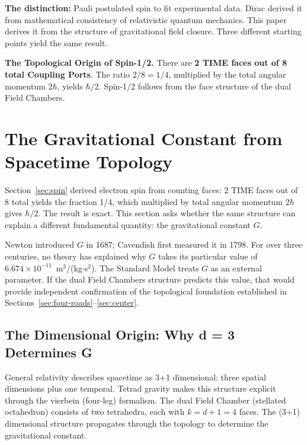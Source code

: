 \documentclass[aps,prd,preprint,superscriptaddress,showpacs,preprintnumbers,amsmath,amssymb,nofootinbib]{revtex4-2}
\begin{document}
\textbf{The distinction:} Pauli postulated spin to fit experimental data. Dirac derived it from mathematical consistency of relativistic quantum mechanics. This paper derives it from the structure of gravitational field closure. Three different starting points yield the same result.

\textbf{The Topological Origin of Spin-1/2.} There are \textbf{2 TIME faces out of 8 total Coupling Ports}. The ratio $2/8 = 1/4$, multiplied by the total angular momentum $2\hbar$, yields $\hbar/2$. Spin-1/2 follows from the face structure of the dual Field Chambers.

\section{The Gravitational Constant from Spacetime Topology}
\label{sec:gravitational-constant}

Section~\ref{sec:spin} derived electron spin from counting faces: 2 TIME faces out of 8 total yields the fraction 1/4, which multiplied by total angular momentum $2\hbar$ gives $\hbar/2$. The result is exact. This section asks whether the same structure can explain a different fundamental quantity: the gravitational constant $G$.

Newton introduced $G$ in 1687; Cavendish first measured it in 1798. For over three centuries, no theory has explained why $G$ takes its particular value of $6.674 \times 10^{-11}$~m$^3$/(kg$\cdot$s$^2$). The Standard Model treats $G$ as an external parameter. If the dual Field Chambers structure predicts this value, that would provide independent confirmation of the topological foundation established in Sections~\ref{sec:four-roads}--\ref{sec:center}.

\subsection{The Dimensional Origin: Why d = 3 Determines G}
\label{subsec:g-structure}

General relativity describes spacetime as 3+1 dimensional: three spatial dimensions plus one temporal. Tetrad gravity makes this structure explicit through the vierbein (four-leg) formalism. The dual Field Chamber (stellated octahedron) consists of two tetrahedra, each with $k = d + 1 = 4$ faces. The (3+1) dimensional structure propagates through the topology to determine the gravitational constant.
\end{document}
